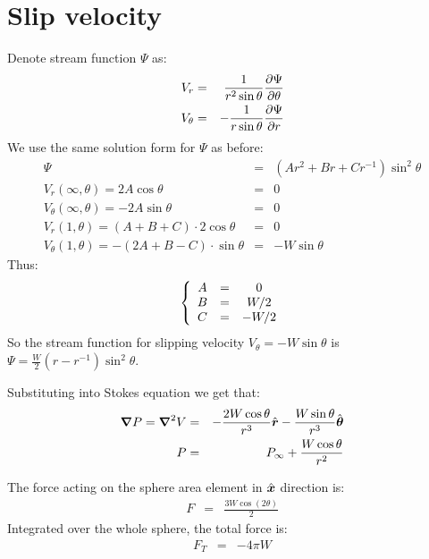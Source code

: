 \documentclass[11pt]{article}
\begin{document}
\section{Slip velocity}
Denote stream function $\Psi$ as:
\begin{eqnarray}
  V_r &=& \frac{1}{r^2 \sin\theta}\deriv{\Psi}{\theta} \\
  V_\theta &=& -\frac{1}{r \sin\theta}\deriv{\Psi}{r}
\end{eqnarray}
We use the same solution form for $\Psi$ as before:
\begin{eqnarray}
  \Psi &=& (A r^2 + B r + C r^{-1})\sin^2\theta\\
  V_r(\infty, \theta) = 2A \cos\theta &=& 0 \\
  V_\theta(\infty, \theta) = -2A \sin\theta &=& 0 \\
  V_r(1, \theta) = (A+B+C)\cdot 2\cos\theta &=& 0 \\
  V_\theta(1, \theta) = -(2A+B-C)\cdot \sin\theta &=& -W\sin\theta 
\end{eqnarray}
Thus:
\begin{eqnarray}
  \brc{ccc}{A &=& 0 \\ B &=& W/2 \\ C &=& -W/2}
\end{eqnarray}
So the stream function for slipping velocity $V_\theta = -W\sin\theta$
is $\Psi = \frac{W}{2}(r - r^{-1})\sin^2\theta$.

Substituting into Stokes equation we get that:
\begin{eqnarray}
  \bnabla P = \bLaplacian V &=& -\frac{2 W \cos\theta}{r^3} \brhat 
  -\frac{W \sin \theta}{r^3} \bthetahat \\
  P &=& P_\infty + \frac{W \cos\theta}{r^2}
\end{eqnarray}

The force acting on the sphere area element in $\bxhat$ direction is:
\begin{eqnarray}
  F &=& \frac{3W \cos(2\theta)}{2}
\end{eqnarray}
Integrated over the whole sphere, the total force is:
\begin{eqnarray}
  F_T &=& -4\pi W
\end{eqnarray}
\end{document}
